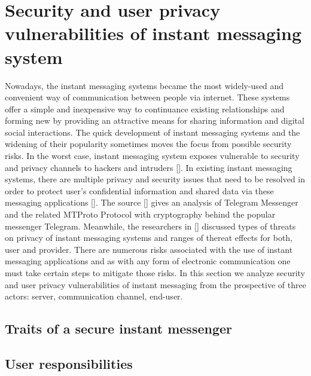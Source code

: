 \chapter{Security and user privacy vulnerabilities of instant messaging system}
\label{ch:security-and-user-privacy-vulnerabilities-of-instant-messaging-system}

Nowadays, the instant messaging systems became the most widely-used and convenient way of communication between
people via internet.
These systems offer a simple and inexpensive way to continuance existing relationships and forming new by providing an
attractive means for sharing information and digital social interactions.
The quick development of instant messaging systems and the widening of their popularity sometimes moves the
focus from possible security risks.
In the worst case, instant messaging system exposes vulnerable to security and privacy channels to hackers and intruders
[\cite{mcclure2009hacking, mannan2005secure}].
In existing instant messaging systems, there are multiple privacy and security issues that need to be resolved in order
to protect user's confidential information and shared data via these messaging applications [\cite{loesing2006privacy}].
The source [\cite{job2015modified}] gives an analysis of Telegram Messenger and the related MTProto Protocol with cryptography
behind the popular messenger Telegram.
Meanwhile, the researchers in [\cite{khan2015survey}] discussed types of threats on privacy of instant messaging systems
and ranges of thereat effects for both, user and provider.
There are numerous risks associated with the use of instant messaging applications and as with any form of
electronic communication one must take certain steps to mitigate those risks.
In this section we analyze security and user privacy vulnerabilities of instant messaging from the prospective of three
actors: server, communication channel, end-user.


%
%
%
%


\section{Traits of a secure instant messenger}\label{sec:traits-of-a-secure-instant-messenger}



\section{User responsibilities}\label{sec:user-responsibilities}
